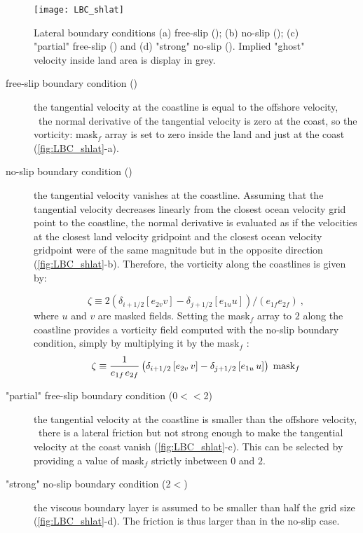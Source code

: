 \documentclass[../main/NEMO_manual]{subfiles}
\begin{document}
\begin{figure}[!p]
  \centering
  \texttt{[image: LBC\_shlat]}
  \caption[Lateral boundary conditions]{
    Lateral boundary conditions
    (a) free-slip                       (\protect{});
    (b) no-slip                         (\protect{});
    (c) "partial" free-slip (\protect{}) and
    (d) "strong" no-slip    (\protect{}).
    Implied "ghost" velocity inside land area is display in grey.}
  \label{fig:LBC_shlat}
\end{figure}

\begin{description}

\item [free-slip boundary condition ({})] the tangential velocity at
  the coastline is equal to the offshore velocity,
  \ie\ the normal derivative of the tangential velocity is zero at the coast,
  so the vorticity: mask$_{f}$ array is set to zero inside the land and just at the coast
  (\autoref{fig:LBC_shlat}-a).

\item [no-slip boundary condition ({})] the tangential velocity vanishes at the coastline.
  Assuming that the tangential velocity decreases linearly from
  the closest ocean velocity grid point to the coastline,
  the normal derivative is evaluated as if the velocities at the closest land velocity gridpoint and
  the closest ocean velocity gridpoint were of the same magnitude but in the opposite direction
  (\autoref{fig:LBC_shlat}-b).
  Therefore, the vorticity along the coastlines is given by:

  \[
    \zeta \equiv 2 \left(\delta_{i+1/2} \left[e_{2v} v \right] - \delta_{j+1/2} \left[e_{1u} u \right] \right) / \left(e_{1f} e_{2f} \right) \ ,
  \]
  where $u$ and $v$ are masked fields.
  Setting the mask$_{f}$ array to $2$ along the coastline provides a vorticity field computed with
  the no-slip boundary condition, simply by multiplying it by the mask$_{f}$ :
  \[
    \zeta \equiv \frac{1}{e_{1f} {\kern 1pt}e_{2f} }\left( {\delta_{i+1/2}
        \left[ {e_{2v} \,v} \right]-\delta_{j+1/2} \left[ {e_{1u} \,u} \right]}
    \right)\;\mbox{mask}_f
  \]

\item ["partial" free-slip boundary condition (0$<$$<$2)] the tangential velocity at
  the coastline is smaller than the offshore velocity, \ie\ there is a lateral friction but
  not strong enough to make the tangential velocity at the coast vanish (\autoref{fig:LBC_shlat}-c).
  This can be selected by providing a value of mask$_{f}$ strictly inbetween $0$ and $2$.

\item ["strong" no-slip boundary condition (2$<$)] the viscous boundary layer is assumed to
  be smaller than half the grid size (\autoref{fig:LBC_shlat}-d).
  The friction is thus larger than in the no-slip case.

\end{description}
\end{document}
